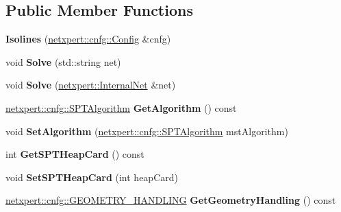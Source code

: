 \subsection*{Public Member Functions}
\begin{DoxyCompactItemize}
\item 
{\bfseries Isolines} (\hyperlink{structnetxpert_1_1cnfg_1_1Config}{netxpert\+::cnfg\+::\+Config} \&cnfg)\hypertarget{classnetxpert_1_1Isolines_acb5bc1dcfd8535cf2382da7bb2fc72e0}{}\label{classnetxpert_1_1Isolines_acb5bc1dcfd8535cf2382da7bb2fc72e0}

\item 
void {\bfseries Solve} (std\+::string net)\hypertarget{classnetxpert_1_1Isolines_ad39fb089dddaa857f16f2a9e1b24ea99}{}\label{classnetxpert_1_1Isolines_ad39fb089dddaa857f16f2a9e1b24ea99}

\item 
void {\bfseries Solve} (\hyperlink{classnetxpert_1_1InternalNet}{netxpert\+::\+Internal\+Net} \&net)\hypertarget{classnetxpert_1_1Isolines_a5d079814c4ed89bd44e4325f0bd98ec4}{}\label{classnetxpert_1_1Isolines_a5d079814c4ed89bd44e4325f0bd98ec4}

\item 
\hyperlink{namespacenetxpert_1_1cnfg_a6ff755ed7f76e0049e3eeeed86c9b55d}{netxpert\+::cnfg\+::\+S\+P\+T\+Algorithm} {\bfseries Get\+Algorithm} () const \hypertarget{classnetxpert_1_1Isolines_a760a64b82f9861b02307628c77834951}{}\label{classnetxpert_1_1Isolines_a760a64b82f9861b02307628c77834951}

\item 
void {\bfseries Set\+Algorithm} (\hyperlink{namespacenetxpert_1_1cnfg_a6ff755ed7f76e0049e3eeeed86c9b55d}{netxpert\+::cnfg\+::\+S\+P\+T\+Algorithm} mst\+Algorithm)\hypertarget{classnetxpert_1_1Isolines_a5bab8b9300026387a4b654783182c7bb}{}\label{classnetxpert_1_1Isolines_a5bab8b9300026387a4b654783182c7bb}

\item 
int {\bfseries Get\+S\+P\+T\+Heap\+Card} () const \hypertarget{classnetxpert_1_1Isolines_a472e713ce884e0a52cbc965ea5c88bb0}{}\label{classnetxpert_1_1Isolines_a472e713ce884e0a52cbc965ea5c88bb0}

\item 
void {\bfseries Set\+S\+P\+T\+Heap\+Card} (int heap\+Card)\hypertarget{classnetxpert_1_1Isolines_a723ac49d853072e88ea3aa56804ae8e1}{}\label{classnetxpert_1_1Isolines_a723ac49d853072e88ea3aa56804ae8e1}

\item 
\hyperlink{namespacenetxpert_1_1cnfg_a1514d3ae51414bf0bcd8d1fe8e868b89}{netxpert\+::cnfg\+::\+G\+E\+O\+M\+E\+T\+R\+Y\+\_\+\+H\+A\+N\+D\+L\+I\+NG} {\bfseries Get\+Geometry\+Handling} () const \hypertarget{classnetxpert_1_1Isolines_abf02c332c26d2d9963fce909124c351f}{}\label{classnetxpert_1_1Isolines_abf02c332c26d2d9963fce909124c351f}


\end{DoxyCompactItemize}
